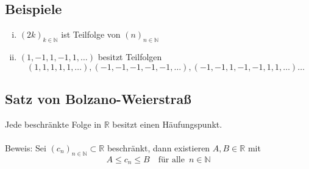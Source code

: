 \subsection{Beispiele} %
\label{sub:beispiele}
\begin{enumerate}[(i)]
	\item $(2k)_{k \in \mathds{N}}$ ist Teilfolge von $(n)_{n \in \mathds{N}}$
	\item $(1,-1,1,-1,1, \ldots )$ besitzt Teilfolgen
	\[
		(1,1,1,1,1, \ldots ) , (-1,-1,-1,-1,-1, \ldots ) , (-1, -1, 1, -1 ,-1,  1, 1, \ldots ) \ldots 
	\]
\end{enumerate}

\subsection{Satz von Bolzano-Weierstraß} %
\label{sub:satz_von_bolzano_weierstraß}
Jede beschränkte Folge in $\mathds{R}$ besitzt einen Häufungspunkt. \\
\vspace{\baselineskip} \\
Beweis: Sei $(c_n)_{n \in \mathds{N}} \subset \mathds{R}$ beschränkt, dann existieren $A,B \in \mathds{R}$ mit
\[
	A \leq c_n \leq B \quad \text{für alle } \, n \in \mathds{N} 
\]
